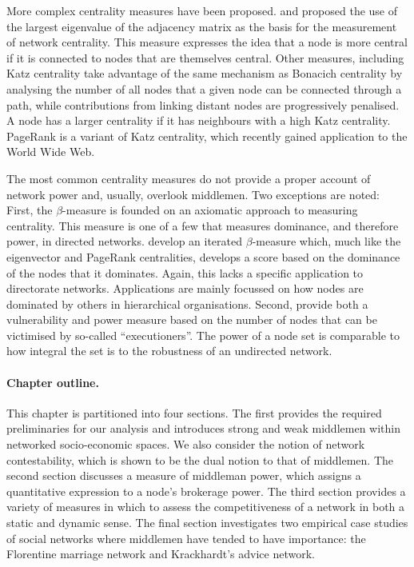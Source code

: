 More complex centrality measures have been proposed. \citet{Bonacich1972,Bonacich1987} and \citet{Bonacich2001} proposed the use of the largest eigenvalue of the adjacency matrix as the basis for the measurement of network centrality. This measure expresses the idea that a node is more central if it is connected to nodes that are themselves central. Other measures, including Katz centrality \citep{Katz1953} take advantage of the same mechanism as Bonacich centrality by analysing the number of all nodes that a given node can be connected through a path, while contributions from linking distant nodes are progressively penalised. A node has a larger centrality if it has neighbours with a high Katz centrality. PageRank \citep{BrinPage1998} is a variant of Katz centrality, which recently gained application to the World Wide Web.

The most common centrality measures do not provide a proper account of network power and, usually, overlook middlemen. Two exceptions are noted: First, the $\beta$-measure \citep{BrinkGilles1996, BrinkGilles2000} is founded on an axiomatic approach to measuring centrality. This measure is one of a few that measures dominance, and therefore power, in directed networks. \citet{BormBrink2002} develop an iterated $\beta$-measure which, much like the eigenvector and PageRank centralities, develops a score based on the dominance of the nodes that it dominates. Again, this lacks a specific application to directorate networks. Applications are mainly focussed on how nodes are dominated by others in hierarchical organisations. Second, \citet{Bozzo2015} provide both a vulnerability and power measure based on the number of nodes that can be victimised by so-called ``executioners''. The power of a node set is comparable to how integral the set is to the robustness of an undirected network.

\paragraph{Chapter outline.}

This chapter is partitioned into four sections. The first provides the required preliminaries for our analysis and introduces strong and weak middlemen within networked socio-economic spaces. We also consider the notion of network contestability, which is shown to be the dual notion to that of middlemen. The second section discusses a measure of middleman power, which assigns a quantitative expression to a node's brokerage power. The third section provides a variety of measures in which to assess the competitiveness of a network in both a static and dynamic sense. The final section investigates two empirical case studies of social networks where middlemen have tended to have importance: the Florentine marriage network and Krackhardt's advice network.

